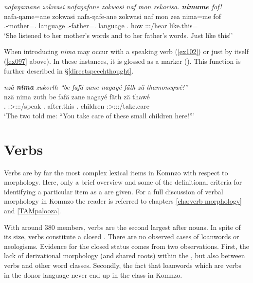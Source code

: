 \begin{exe}
	\ex \emph{nafaŋamane zokwasi nafaŋafane zokwasi naf mon zekarisa. \textbf{nimame} fof!}\\
	\gll nafa-ŋame=ane zokwasi nafa-ŋafe-ane zokwasi naf mon zea nima=me fof\\
	\Third.\Poss{}-mother=\Poss.\Sg{} language \Third.\Poss{}-father=\Poss.\Sg{} language \Tsg.\Erg{} how \Stsg:\Sbj:\Pst:\Pfv/hear {like.this}=\Ins{} \Emph{}\\
	\trans `She listened to her mother's words and to her father's words. Just like this!' 
	\label{ex101}
\end{exe}

When introducing  \emph{nima} may occur with a speaking verb (\ref{ex102}) or just by itself (\ref{ex097} above). In these instances, it is glossed as a  marker (\Quot). This function is further described in \S{}\ref{directspeechthought}.

\begin{exe}
	\ex \emph{nzä \textbf{nima} zukorth ``be fafä zane nagayé fäth zä thamonegwé!''}\\
	\gll nzä nima zuth be fafä zane nagayé fäth zä thawé\\
	\Fsg{}.\Abs{} \Quot{} \Stdu:\Sbj>\Fsg:\Obj:\Pst:\Pfv/speak \Ssg{}.\Erg{} after.this \Dem{}.\Prox{} children \Dim{} \Prox{} \Ssg:\Sbj>\Stpl:\Obj:\Imp:\Ipfv/take.care\\
	\trans `The two told me: ``You take care of these small children here!'''\\ 
	\label{ex102}
\end{exe}

\section{Verbs} \label{verbs}

Verbs are by far the most complex lexical items in Komnzo with respect to morphology. Here, only a brief overview and some of the definitional criteria for identifying a particular item as a  are given. For a full discussion of verbal morphology in Komnzo the reader is referred to chapters \ref{cha:verb morphology} and \ref{TAMpalooza}.%

With around 380 members, verbs are the second largest  after nouns. In spite of its size, verbs constitute a closed . There are no observed cases of loanwords or neologisms. Evidence for the closed status comes from two observations. First, the lack of derivational morphology (and shared roots) within the , but also between verbs and other word classes. Secondly, the fact that loanwords which are verbs in the donor language never end up in the  class in Komnzo.%

